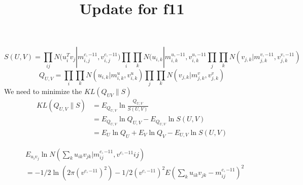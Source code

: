 \documentclass[letterpaper]{article}
\begin{document}
%
 \graphicspath{{figure/}}

\title{Update for f11}
\author{}
\maketitle
\begin{equation}
    S(U,V) = \prod_{ij}N(u_i^Tv_j|m_{i,j}^{c,-11}, v_{i,j}^{c,-11}) \prod_i \prod_k N(u_{i,k}|m_{i,k}^{u,-11}, v_{i,k}^{u,-11} \prod_j \prod_k N(v_{j,k}|m_{j,k}^{v,-11}, v_{j,k}^{v,-11})
\end{equation}
\begin{equation}
    Q_{U,V} = \prod_i \prod_k N(u_{i,k}|m_{i,k}^u, v_{i,k}^u) \prod_j \prod_k N(v_{j,k}|m_{j,k}^v, v_{j,k}^v)
\end{equation}
We need to minimize the $KL(Q_{UV}\|S)$
\begin{equation}
    \begin{split}
    KL(Q_{U,V}\|S) 
    &= E_{Q_{U,V}} \ln \frac{Q_{U,V}}{S(U,V)}\\
    &= E_{Q_{U,V}} \ln Q_{U,V} - E_{Q_{U,V}} \ln S(U,V)\\
    &= E_U \ln Q_U + E_V \ln Q_V - E_{U,V} \ln S(U,V)
    \end{split}
\end{equation}

\begin{equation}
    \begin{split}
    &E_{u_{i}v_{j}}\ln N(\sum_k u_{ik}v_{jk}|m^{c,-11}_{ij}, v^{c,-11}{ij})\\
    &= -1/2 \ln (2\pi (v^{c,-11})^2) - 1/2(v^{c,-11})^2E(\sum_k u_{ik}v_{jk} - m_{ij}^{c,-11})^2\\
    \end{split}
\end{equation}
\end{document}

